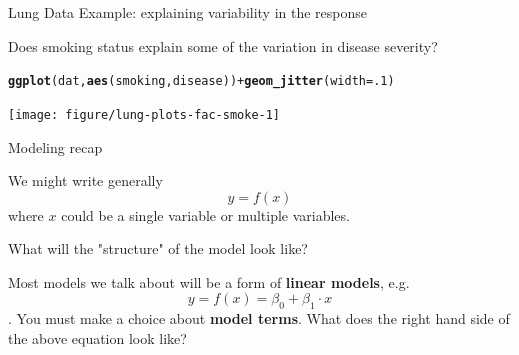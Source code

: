 \documentclass[table]{beamer}\usepackage[]{graphicx}\usepackage[]{color}
\makeatletter
\newcommand{\hlnum}[1]{\textcolor[rgb]{0.686,0.059,0.569}{#1}}%
\newcommand{\hlopt}[1]{\textcolor[rgb]{0,0,0}{#1}}%
\newcommand{\hlstd}[1]{\textcolor[rgb]{0.345,0.345,0.345}{#1}}%
\newcommand{\hlkwc}[1]{\textcolor[rgb]{0.333,0.667,0.333}{#1}}%
\newcommand{\hlkwd}[1]{\textcolor[rgb]{0.737,0.353,0.396}{\textbf{#1}}}%
\newenvironment{kframe}{%
 \def\at@end@of@kframe{}%
 \ifinner\ifhmode%
  \def\at@end@of@kframe{\end{minipage}}%
  \begin{minipage}{\columnwidth}%
 \fi\fi%
 \def\FrameCommand##1{\hskip\@totalleftmargin \hskip-\fboxsep
 \colorbox{shadecolor}{##1}\hskip-\fboxsep
     \hskip-\linewidth \hskip-\@totalleftmargin \hskip\columnwidth}%
 \MakeFramed {\advance\hsize-\width
   \@totalleftmargin\z@ \linewidth\hsize
   \@setminipage}}%
 {\par\unskip\endMakeFramed%
 \at@end@of@kframe}
\newenvironment{knitrout}{}{} %
\makeatother
\begin{document}

\begin{frame}[fragile]{Lung Data Example: explaining variability in the response}

Does smoking status explain some of the variation in disease severity?

\begin{knitrout}\footnotesize
{}\color{fgcolor}\begin{kframe}
\begin{alltt}
\hlkwd{ggplot}\hlstd{(dat,} \hlkwd{aes}\hlstd{(smoking, disease))} \hlopt{+} \hlkwd{geom_jitter}\hlstd{(}\hlkwc{width}\hlstd{=}\hlnum{.1}\hlstd{)}
\end{alltt}
\end{kframe}
\texttt{[image: figure/lung-plots-fac-smoke-1]} 

\end{knitrout}


\end{frame}


\begin{frame}[fragile]{Modeling recap}

We might write generally $$ y = f(x) $$ where $x$ could be a single variable or multiple variables.

\begin{block}{What will the "structure" of the model look like?}

\bi
  \myitem Most models we talk about will be a form of {\bf linear models}, e.g. $$ y = f(x) = \beta_0 + \beta_1 \cdot x $$.
  \myitem You must make a choice about {\bf model terms}. What does the right hand side of the above equation look like?
\ei

\end{block}

\end{frame}

\end{document}

